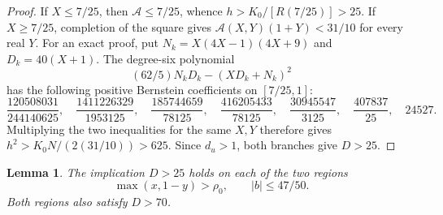 \documentclass[11pt,reqno]{amsart}
\numberwithin{equation}{section}
\newtheorem{lemma}[theorem]{Lemma}
\theoremstyle{definition}
\theoremstyle{remark}
\begin{document}
\begin{proof}
If $X\le7/25$, then $\mathcal A\le7/25$, whence
$h>K_0/[R(7/25)]>25$.
If $X\ge7/25$, completion of the square gives
$\mathcal A(X,Y)(1+Y)<31/10$ for every real $Y$.
For an exact proof, put $N_k=X(4X-1)(4X+9)$ and $D_k=40(X+1)$.
The degree-six polynomial
\[
 (62/5)N_kD_k-(XD_k+N_k)^2
\]
has the following positive Bernstein coefficients on $[7/25,1]$:
\[
 \frac{120508031}{244140625},\quad
 \frac{1411226329}{1953125},\quad
 \frac{185744659}{78125},\quad
 \frac{416205433}{78125},\quad
 \frac{30945547}{3125},\quad
 \frac{407837}{25},\quad24527.
\]
Multiplying the two inequalities for the same $X,Y$ therefore gives
$h^2>K_0N/(2(31/10))>625$. Since $d_u>1$, both branches give
$D>25$.
\end{proof}

\begin{lemma}\label{sm:first-D25}
The implication $D>25$ holds on each of the two regions
\[
 \max(x,1-y)>\rho_0,\qquad |b|\le47/50.
\]
Both regions also satisfy $D>70$.
\end{lemma}
\end{document}
